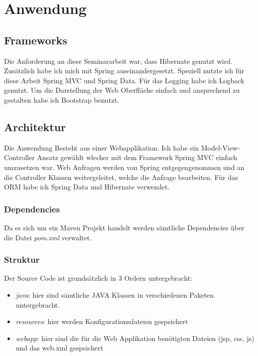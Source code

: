 \chapter{Anwendung}
\label{chap:Anwendung}

\section{Frameworks}
Die Anforderung an diese Seminararbeit war, dass Hibernate genutzt wird.
Zusätzlich habe ich mich mit Spring auseinandergesetzt. Speziell nutzte ich für diese Arbeit Spring MVC und Spring Data. Für das Logging habe ich Logback \cite{Logback} genutzt. Um die Darstellung der Web Oberfläche einfach und ansprechend zu gestalten habe ich Bootstrap \cite{Bootstrap} benutzt.

\section{Architektur}
Die Anwendung Besteht aus einer Webapplikation. Ich habe ein Model-View-Controller Ansatz gewählt wlecher mit dem Framework Spring MVC einfach umzusetzen war. Web Anfragen werden von Spring entgegengenommen und an die Controller Klassen weitergeleitet, welche die Anfrage bearbeiten.
Für das ORM habe ich Spring Data und Hibernate verwendet. 

\subsection{Dependencies}
Da es sich um ein Maven Projekt handelt werden sämtliche Dependencies über die Datei \emph{pom.xml} verwaltet.


\subsection{Struktur}
Der Source Code ist grundsätzlich in 3 Ordern untergebracht:
\begin{itemize}
	\item \emph{java}: hier sind sämtliche JAVA Klassen in verschiedenen Paketen untergebracht.
	\item \emph{resources}: hier werden Konfigurationsdateien gespeichert
	\item \emph{webapp}: hier sind die für die Web Applikation benötigten Dateien (jsp, css, js) und das web.xml gespeichert
\end{itemize}

\newpage

